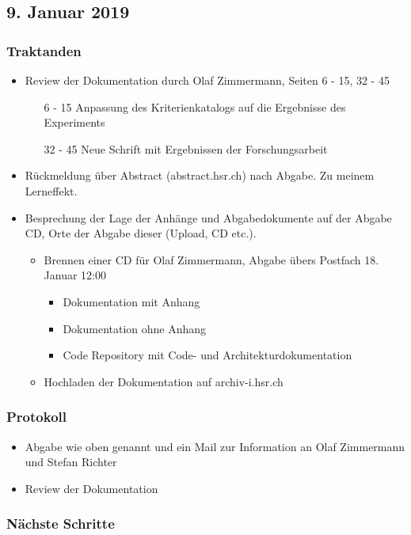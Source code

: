 \documentclass{article}
\begin{document}
\subsection{9. Januar 2019}
\subsubsection{Traktanden}
\begin{itemize}
    \item Review der Dokumentation durch Olaf Zimmermann, Seiten 6 - 15, 32 - 45
        \begin{itemize}
            \item[6 - 15] Anpassung des Kriterienkatalogs auf die Ergebnisse des Experiments
            \item[32 - 45] Neue Schrift mit Ergebnissen der Forschungsarbeit
        \end{itemize}
    \item Rückmeldung über Abstract (abstract.hsr.ch) nach Abgabe. Zu meinem Lerneffekt.
    \item Besprechung der Lage der Anhänge und Abgabedokumente auf der Abgabe CD, Orte der Abgabe dieser (Upload, CD etc.).
        \begin{itemize}
            \item Brennen einer CD für Olaf Zimmermann, Abgabe übers Postfach 18. Januar 12:00
                \begin{itemize}
                    \item Dokumentation mit Anhang
                    \item Dokumentation ohne Anhang
                    \item Code Repository mit Code- und Architekturdokumentation
                \end{itemize}
            \item Hochladen der Dokumentation auf archiv-i.hsr.ch
        \end{itemize}
\end{itemize}
\subsubsection{Protokoll}
\begin{itemize}
    \item Abgabe wie oben genannt und ein Mail zur Information an Olaf Zimmermann und Stefan Richter
    \item Review der Dokumentation
\end{itemize}
\subsubsection{Nächste Schritte}
\end{document}
